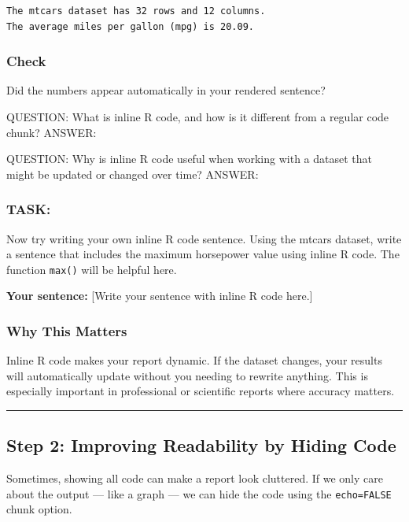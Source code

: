 \documentclass[
]{article}
\begin{document}
\begin{verbatim}
The mtcars dataset has 32 rows and 12 columns.
The average miles per gallon (mpg) is 20.09.
\end{verbatim}

\subsubsection{Check}\label{check}

Did the numbers appear automatically in your rendered sentence?

QUESTION: What is inline R code, and how is it different from a regular
code chunk? ANSWER:

QUESTION: Why is inline R code useful when working with a dataset that
might be updated or changed over time? ANSWER:

\subsubsection{TASK:}\label{task-7}

Now try writing your own inline R code sentence. Using the mtcars
dataset, write a sentence that includes the maximum horsepower value
using inline R code. The function \texttt{max()} will be helpful here.

\textbf{Your sentence:} {[}Write your sentence with inline R code
here.{]}

\subsubsection{Why This Matters}\label{why-this-matters}

Inline R code makes your report dynamic. If the dataset changes, your
results will automatically update without you needing to rewrite
anything. This is especially important in professional or scientific
reports where accuracy matters.

\begin{center}\rule{0.5\linewidth}{0.5pt}\end{center}

\subsection{Step 2: Improving Readability by Hiding
Code}\label{step-2-improving-readability-by-hiding-code}

Sometimes, showing all code can make a report look cluttered. If we only
care about the output --- like a graph --- we can hide the code using
the \texttt{echo=FALSE} chunk option.
\end{document}
